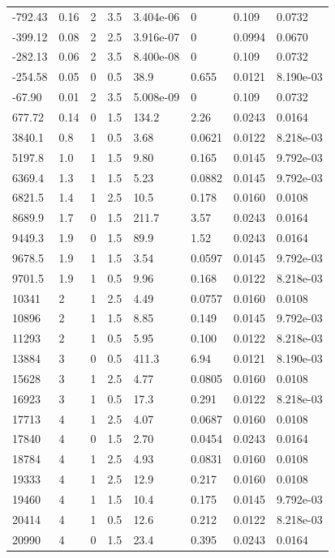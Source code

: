 \documentclass[preview]{standalone}
\begin{document}
{{\begin{tabular}{L{1.2cm}C{1.2cm} C{0.3cm}C{0.5cm} C{1.4cm}C{1.4cm} C{1.4cm}C{1.4cm}}
  -792.43  &  0.16  & 2     & 3.5 &  3.404e-06  & 0  & 0.109 &  0.0732   \\ 
  -399.12  &  0.08  & 2     & 2.5 &  3.916e-07  & 0  & 0.0994 &  0.0670   \\ 
  -282.13  &  0.06  & 2     & 3.5 &  8.400e-08  & 0  & 0.109 &  0.0732   \\ 
  -254.58  &  0.05  & 0     & 0.5 &  38.9  & 0.655  & 0.0121 &  8.190e-03   \\ 
  -67.90  &  0.01  & 2     & 3.5 &  5.008e-09  & 0  & 0.109 &  0.0732   \\ 
  677.72  &  0.14  & 0     & 1.5 &  134.2  & 2.26  & 0.0243 &  0.0164   \\ 
  3840.1  &   0.8  & 1     & 0.5 &  3.68  & 0.0621  & 0.0122 &  8.218e-03   \\ 
  5197.8  &   1.0  & 1     & 1.5 &  9.80  & 0.165  & 0.0145 &  9.792e-03   \\ 
  6369.4  &   1.3  & 1     & 1.5 &  5.23  & 0.0882  & 0.0145 &  9.792e-03   \\ 
  6821.5  &   1.4  & 1     & 2.5 &  10.5  & 0.178  & 0.0160 &  0.0108   \\ 
  8689.9  &   1.7  & 0     & 1.5 &  211.7  & 3.57  & 0.0243 &  0.0164   \\ 
  9449.3  &   1.9  & 0     & 1.5 &  89.9  & 1.52  & 0.0243 &  0.0164   \\ 
  9678.5  &   1.9  & 1     & 1.5 &  3.54  & 0.0597  & 0.0145 &  9.792e-03   \\ 
  9701.5  &   1.9  & 1     & 0.5 &  9.96  & 0.168  & 0.0122 &  8.218e-03   \\ 
  10341  &     2  & 1     & 2.5 &  4.49  & 0.0757  & 0.0160 &  0.0108   \\ 
  10896  &     2  & 1     & 1.5 &  8.85  & 0.149  & 0.0145 &  9.792e-03   \\ 
  11293  &     2  & 1     & 0.5 &  5.95  & 0.100  & 0.0122 &  8.218e-03   \\ 
  13884  &     3  & 0     & 0.5 &  411.3  & 6.94  & 0.0121 &  8.190e-03   \\ 
  15628  &     3  & 1     & 2.5 &  4.77  & 0.0805  & 0.0160 &  0.0108   \\ 
  16923  &     3  & 1     & 0.5 &  17.3  & 0.291  & 0.0122 &  8.218e-03   \\ 
  17713  &     4  & 1     & 2.5 &  4.07  & 0.0687  & 0.0160 &  0.0108   \\ 
  17840  &     4  & 0     & 1.5 &  2.70  & 0.0454  & 0.0243 &  0.0164   \\ 
  18784  &     4  & 1     & 2.5 &  4.93  & 0.0831  & 0.0160 &  0.0108   \\ 
  19333  &     4  & 1     & 2.5 &  12.9  & 0.217  & 0.0160 &  0.0108   \\ 
  19460  &     4  & 1     & 1.5 &  10.4  & 0.175  & 0.0145 &  9.792e-03   \\ 
  20414  &     4  & 1     & 0.5 &  12.6  & 0.212  & 0.0122 &  8.218e-03   \\ 
  20990  &     4  & 0     & 1.5 &  23.4  & 0.395  & 0.0243 &  0.0164   \\ 
\hline 
\end{tabular} 

}}
\end{document}
